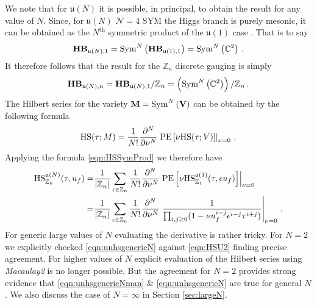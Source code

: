 \documentclass[main.tex]{subfiles}
\begin{document}
We note that for $\mathfrak{u}(N)$ it is possible, in principal, to obtain the result for any value of $N$. Since, for $\mathfrak{u}(N)$ $\mathcal{N}=4$ SYM the Higgs branch is purely mesonic, it can be obtained as the $N^{\text{th}}$ symmetric product of the $\mathfrak{u}(1)$ case \cite{Feng:2007ur,Benvenuti:2006qr,Seiberg:1997ax,Gang:2011xp,Forcella:2008bb}. That is to say
\begin{equation}
\mathbf{HB}_{\mathfrak{u}(N),1}=\operatorname{Sym}^N\left(\mathbf{HB}_{\mathfrak{u}(1),1}\right)=\operatorname{Sym}^N\left(\mathbb{C}^2\right)\,.
\end{equation}
It therefore follows that the result for the $\mathbb{Z}_n$ discrete gauging is simply
\begin{equation}\label{eqn:unhsgenericNman}
\mathbf{HB}_{\mathfrak{u}(N),n}=\mathbf{HB}_{\mathfrak{u}(N),1}/\mathbb{Z}_n=\left(\operatorname{Sym}^N\left(\mathbb{C}^2\right)\right)/\mathbb{Z}_n\,.
\end{equation}
The Hilbert series for the variety $\mathbf{M}=\operatorname{Sym}^N\left(\mathbf{V}\right)$ can be obtained by the following formula \cite{Nakajima:2003pg,Benvenuti:2006qr,Feng:2007ur}
\begin{equation}\label{eqn:HSSymProd}
\textrm{HS}(\tau;M)=\frac{1}{N!}\frac{\partial^N}{\partial\nu^N}\left.\operatorname{\mathrm{PE}}\left[\nu \textrm{HS}(\tau;V)\right]\right|_{\nu=0}\,.
\end{equation}
Applying the formula \eqref{eqn:HSSymProd} we therefore have
\begin{align}
\textrm{HS}_{\mathbb{Z}_n}^{\mathfrak{u}(N)}(\tau,u_f)=&\frac{1}{|\mathbb{Z}_n|}\sum_{\epsilon\in\mathbb{Z}_n}\frac{1}{N!}\frac{\partial^N}{\partial\nu^N}\left.\operatorname{\mathrm{PE}}\left[\nu \textrm{HS}_{\mathbb{Z}_1}^{\mathfrak{u}(1)}(\tau,\epsilon u_f)\right]\right|_{\nu=0}\\
=&\frac{1}{|\mathbb{Z}_n|}\sum_{\epsilon\in\mathbb{Z}_n}\frac{1}{N!}\frac{\partial^N}{\partial\nu^N}\left.\frac{1}{\prod_{i,j\geq0}(1- \nu u_f^{i-j}\epsilon^{i-j}\tau^{i+j})}\right|_{\nu=0}\label{eqn:unhsgenericN}\,.
\end{align}
For generic large values of $N$ evaluating the derivative is rather tricky. For $N=2$ we explicitly checked \eqref{eqn:unhsgenericN} against \eqref{eqn:HSU2} finding precise agreement. For higher values of $N$ explicit evaluation of the Hilbert series using \textit{Macaulay2} is no longer possible. But the agreement for $N=2$ provides strong evidence that \eqref{eqn:unhsgenericNman} \& \eqref{eqn:unhsgenericN} are true for general $N$. We also discuss the case of $N=\infty$ in Section \ref{sec:largeN}.
\end{document}
